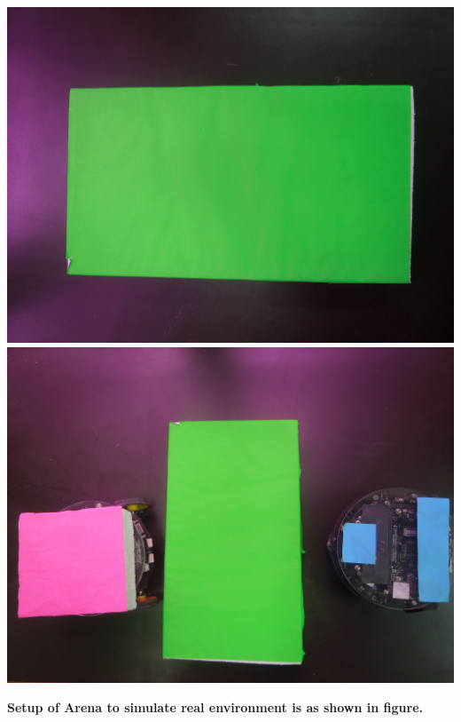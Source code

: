 \documentclass[report]{res}
\begin{document}
	\begin{center}
		\includegraphics[scale = 0.05]{graphics/pics/DSCN0045.jpg}
		\includegraphics[scale = 0.05]{graphics/pics/DSCN0046.jpg}\\
	\end{center}
	
	\pagebreak
	
	
	\textbf{\large Setup of Arena to simulate real environment is as shown in figure.}
	
\end{document}
